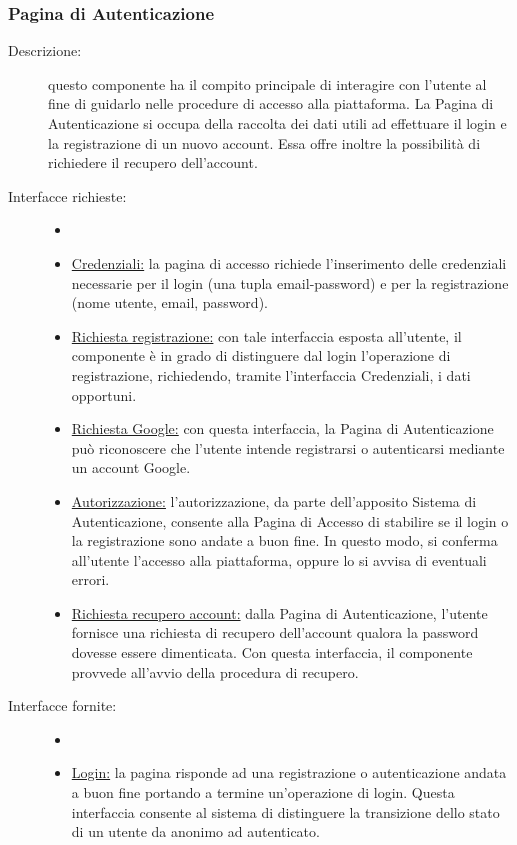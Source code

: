 \documentclass[11pt, a4paper]{article}
\theoremstyle{definition} %
\begin{document}
\subsubsection{Pagina di Autenticazione}
\begin{description}
    \item[Descrizione:] questo componente ha il compito
    principale di interagire con l'utente al fine di guidarlo
    nelle procedure di accesso alla piattaforma.
    La Pagina di Autenticazione si occupa della raccolta dei dati
    utili ad effettuare il login e la registrazione
    di un nuovo account. Essa offre inoltre la possibilità di
    richiedere il recupero dell'account.
    \item[Interfacce richieste:]
    \begin{itemize}
        \item[]
        \item \underline{Credenziali:} la pagina di accesso
        richiede l'inserimento delle credenziali necessarie
        per il login (una tupla email-password) e per la
        registrazione (nome utente, email, password).

        \item \underline{Richiesta registrazione:} con tale
        interfaccia esposta all'utente, il componente è in grado
        di distinguere dal login l'operazione di registrazione,
        richiedendo, tramite l'interfaccia Credenziali, i dati
        opportuni.

        \item \underline{Richiesta Google:} con questa interfaccia,
        la Pagina di Autenticazione può riconoscere che l'utente
        intende registrarsi o autenticarsi mediante un account
        Google.

        \item \underline{Autorizzazione:} l'autorizzazione, da
        parte dell'apposito Sistema di Autenticazione, consente
        alla Pagina di Accesso di stabilire se il login o la
        registrazione sono andate a buon fine. In questo modo, si
        conferma all'utente l'accesso alla piattaforma, oppure lo
        si avvisa di eventuali errori.

        \item \underline{Richiesta recupero account:} dalla Pagina
        di Autenticazione, l'utente fornisce una richiesta di
        recupero dell'account qualora la password dovesse essere
        dimenticata. Con questa interfaccia, il componente provvede
        all'avvio della procedura di recupero.
    \end{itemize}
    \item[Interfacce fornite:]
    \begin{itemize}
        \item[]
        \item \underline{Login:} la pagina risponde ad una registrazione
        o autenticazione andata a buon fine portando a termine un'operazione
        di login. Questa interfaccia consente al sistema di distinguere
        la transizione dello stato di un utente da anonimo ad autenticato.


\end{itemize}
\end{description}
\end{document}

